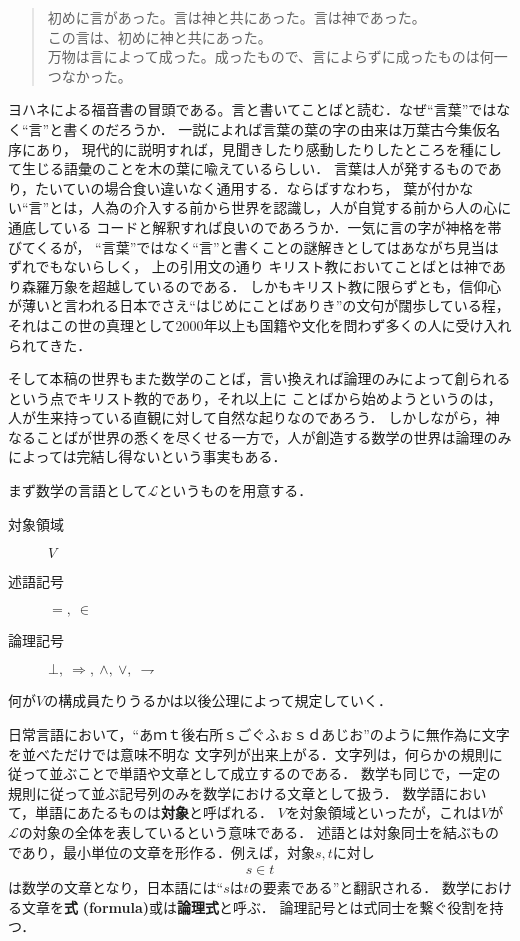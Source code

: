 	\begin{quote}
		初めに言があった。言は神と共にあった。言は神であった。\\
		この言は、初めに神と共にあった。\\
		万物は言によって成った。成ったもので、言によらずに成ったものは何一つなかった。
	\end{quote}
	ヨハネによる福音書の冒頭である。言と書いてことばと読む．なぜ``言葉''ではなく``言''と書くのだろうか．
	一説によれば言葉の葉の字の由来は万葉古今集仮名序にあり，
	現代的に説明すれば，見聞きしたり感動したりしたところを種にして生じる語彙のことを木の葉に喩えているらしい．
	言葉は人が発するものであり，たいていの場合食い違いなく通用する．ならばすなわち，
	葉が付かない``言''とは，人為の介入する前から世界を認識し，人が自覚する前から人の心に通底している
	コードと解釈すれば良いのであろうか．一気に言の字が神格を帯びてくるが，
	``言葉''ではなく``言''と書くことの謎解きとしてはあながち見当はずれでもないらしく，
	上の引用文の通り%
	キリスト教においてことばとは神であり森羅万象を超越しているのである．
	しかもキリスト教に限らずとも，信仰心が薄いと言われる日本でさえ``はじめにことばありき''の文句が闊歩している程，
	それはこの世の真理として2000年以上も国籍や文化を問わず多くの人に受け入れられてきた．
	\begin{comment}
		実際に自然言語の発生が事物の観測なしに起こり得たかという問題は言語哲学上も決着がついていないらしいが，
		少なくとも
	\end{comment}
	そして本稿の世界もまた数学のことば，言い換えれば論理のみによって創られるという点でキリスト教的であり，それ以上に
	ことばから始めようというのは，人が生来持っている直観に対して自然な起りなのであろう．
	しかしながら，神なることばが世界の悉くを尽くせる一方で，人が創造する数学の世界は論理のみによっては完結し得ないという事実もある．
	
	まず数学の言語として$\mathcal{L}$というものを用意する．
	\begin{description}
		\item[対象領域] $V$
		\item[述語記号] $=,\ \in$
		\item[論理記号] $\bot,\ \Longrightarrow,\ \wedge,\ \vee,\ \rightharpoondown$
	\end{description}
	何が$V$の構成員たりうるかは以後公理によって規定していく．
	
	日常言語において，``あｍｔ後右所ｓごぐふぉｓｄあじお''のように無作為に文字を並べただけでは意味不明な
	文字列が出来上がる．文字列は，何らかの規則に従って並ぶことで単語や文章として成立するのである．
	数学も同じで，一定の規則に従って並ぶ記号列のみを数学における文章として扱う．
	数学語において，単語にあたるものは{\bf 対象}と呼ばれる．
	$V$を対象領域といったが，これは$V$が$\mathcal{L}$の対象の全体を表しているという意味である．
	述語とは対象同士を結ぶものであり，最小単位の文章を形作る．例えば，対象$s,t$に対し
	\begin{align}
		s \in t
	\end{align}
	は数学の文章となり，日本語には``$s$は$t$の要素である''と翻訳される．
	数学における文章を{\bf 式}
	{\bf (formula)}或は{\bf 論理式}と呼ぶ．
	論理記号とは式同士を繋ぐ役割を持つ．
	
